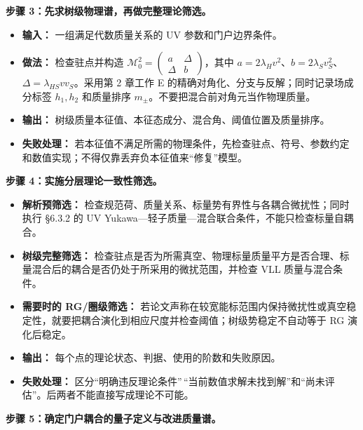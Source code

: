 \documentclass[
  chinese,
  UTF8]{ctexart}
\providecommand{\tightlist}{%
  \setlength{\itemsep}{0pt}\setlength{\parskip}{0pt}}
\begin{document}
\textbf{步骤 3：先求树级物理谱，再做完整理论筛选。}

\begin{itemize}
\tightlist
\item
  \textbf{输入：} 一组满足代数质量关系的 UV 参数和门户边界条件。
\item
  \textbf{做法：} 检查驻点并构造
  \(\mathcal M_0^2=\begin{pmatrix}a&\Delta\\\Delta&b\end{pmatrix}\)，其中
  \(a=2\lambda_Hv^2\)、\(b=2\lambda_Sv_S^2\)、\(\Delta=\lambda_{HS}vv_S\)。采用第
  2 章工作 E 的精确对角化、分支与反解；同时记录场成分标签 \(h_1,h_2\)
  和质量排序 \(m_\pm\)。不要把混合前对角元当作物理质量。
\item
  \textbf{输出：}
  树级质量本征值、本征态成分、混合角、阈值位置及质量排序。
\item
  \textbf{失败处理：}
  若本征值不满足所需的物理条件，先检查驻点、符号、参数约定和数值实现；不得仅靠丢弃负本征值来``修复''模型。
\end{itemize}

\textbf{步骤 4：实施分层理论一致性筛选。}

\begin{itemize}
\tightlist
\item
  \textbf{解析预筛选：}
  检查规范荷、质量关系、标量势有界性与各耦合微扰性；同时执行 §6.3.2 的
  UV Yukawa---轻子质量---混合联合条件，不能只检查标量自耦合。
\item
  \textbf{树级完整筛选：}
  检查驻点是否为所需真空、物理标量质量平方是否合理、标量混合后的耦合是否仍处于所采用的微扰范围，并检查
  VLL 质量与混合条件。
\item
  \textbf{需要时的 RG/圈级筛选：}
  若论文声称在较宽能标范围内保持微扰性或真空稳定性，就要把耦合演化到相应尺度并检查阈值；树级势稳定不自动等于
  RG 演化后稳定。
\item
  \textbf{输出：} 每个点的理论状态、判据、使用的阶数和失败原因。
\item
  \textbf{失败处理：}
  区分``明确违反理论条件''\,``当前数值求解未找到解''和``尚未评估''。后两者不能直接写成理论不可能。
\end{itemize}

\textbf{步骤 5：确定门户耦合的量子定义与改进质量谱。}
\end{document}
